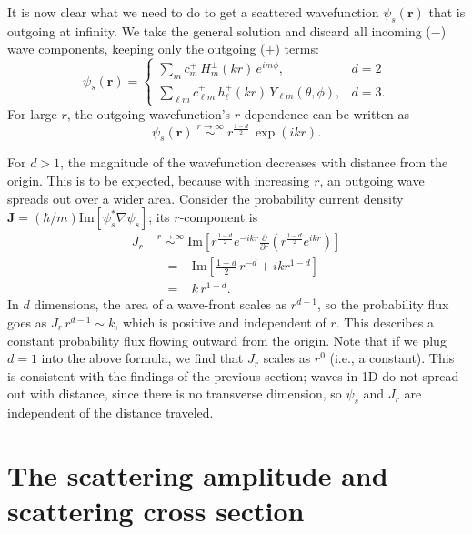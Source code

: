 \documentclass[pra,12pt]{revtex4}
\begin{document}
It is now clear what we need to do to get a scattered wavefunction
$\psi_s(\mathbf{r})$ that is outgoing at infinity.  We take the
general solution and discard all incoming ($-$) wave components,
keeping only the outgoing ($+$) terms:
\begin{equation}
  \psi_s(\mathbf{r}) = \begin{cases} \displaystyle\sum_{m} c_m^+\,H_m^\pm(kr)\,e^{im\phi}, &d=2\\ \displaystyle\sum_{\ell m} c_{\ell m}^+\,h_\ell^+(kr)\,Y_{\ell m}(\theta,\phi),&d=3.\end{cases}
\end{equation}
For large $r$, the outgoing wavefunction's $r$-dependence can be
written as
\begin{equation}
  \psi_s(\mathbf{r}) \; \overset{r\rightarrow\infty}{\sim} \; r^{\frac{1-d}{2}} \,\exp\left(ikr\right).
\end{equation}

For $d > 1$, the magnitude of the wavefunction decreases with distance
from the origin.  This is to be expected, because with increasing $r$,
an outgoing wave spreads out over a wider area.  Consider the
probability current density $\mathbf{J} = (\hbar/m)
\mathrm{Im}\left[\psi_s^*\nabla\psi_s\right]$; its $r$-component is
\begin{equation}
  \begin{aligned}J_r \; &\overset{r\rightarrow\infty}{\sim} \; \mathrm{Im}\left[r^{\frac{1-d}{2}} e^{-ikr} \frac{\partial}{\partial r}\left(r^{\frac{1-d}{2}} e^{ikr}\right)\right] \\ &\;\;=\;\;\;\mathrm{Im}\left[\frac{1-d}{2}\, r^{-d} + ik r^{1-d}\right]\\ &\;\;=\;\;\; k \,r^{1-d}.\end{aligned}
\end{equation}
In $d$ dimensions, the area of a wave-front scales as $r^{d-1}$, so
the probability flux goes as $J_r \,r^{d-1} \sim k$, which is
positive and independent of $r$.  This describes a constant
probability flux flowing outward from the origin.  Note that if we
plug $d=1$ into the above formula, we find that $J_r$ scales as $r^0$
(i.e., a constant).  This is consistent with the findings of the
previous section; waves in 1D do not spread out with distance, since
there is no transverse dimension, so $\psi_s$ and $J_r$ are
independent of the distance traveled.

\section{The scattering amplitude and scattering cross section}
\label{sec:scattering_amplitude}
\end{document}
